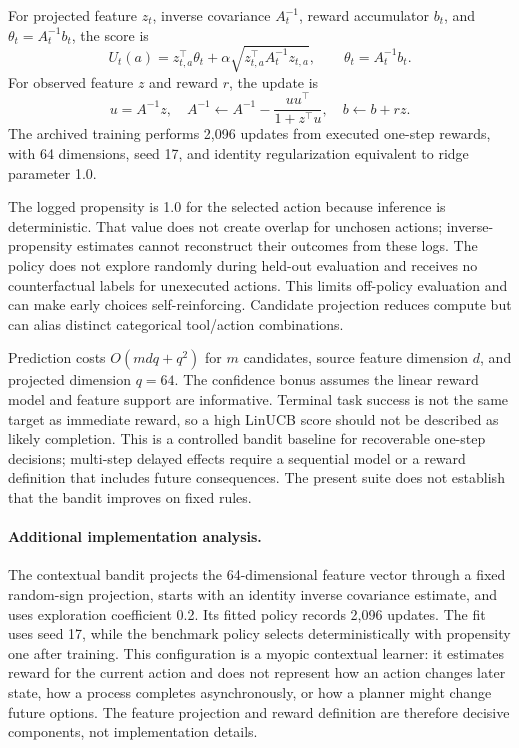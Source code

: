 For projected feature $z_t$, inverse covariance $A_t^{-1}$, reward accumulator $b_t$, and $\theta_t=A_t^{-1}b_t$, the score is
\begin{equation}
U_t(a)=z_{t,a}^{\top}\theta_t+\alpha\sqrt{z_{t,a}^{\top}A_t^{-1}z_{t,a}},\qquad
\theta_t=A_t^{-1}b_t.
\end{equation}
For observed feature $z$ and reward $r$, the update is
\begin{equation}
u=A^{-1}z,\quad A^{-1}\leftarrow A^{-1}-\frac{uu^\top}{1+z^\top u},\quad
b\leftarrow b+rz.
\end{equation}
The archived training performs 2,096 updates from executed one-step rewards, with 64 dimensions, seed 17, and identity regularization equivalent to ridge parameter 1.0.

The logged propensity is 1.0 for the selected action because inference is deterministic. That value does not create overlap for unchosen actions; inverse-propensity estimates cannot reconstruct their outcomes from these logs. The policy does not explore randomly during held-out evaluation and receives no counterfactual labels for unexecuted actions. This limits off-policy evaluation and can make early choices self-reinforcing. Candidate projection reduces compute but can alias distinct categorical tool/action combinations.

Prediction costs $O(mdq+q^2)$ for $m$ candidates, source feature dimension $d$, and projected dimension $q=64$. The confidence bonus assumes the linear reward model and feature support are informative. Terminal task success is not the same target as immediate reward, so a high LinUCB score should not be described as likely completion. This is a controlled bandit baseline for recoverable one-step decisions; multi-step delayed effects require a sequential model or a reward definition that includes future consequences. The present suite does not establish that the bandit improves on fixed rules.



\paragraph{Additional implementation analysis.} The contextual bandit projects the 64-dimensional feature vector through a fixed random-sign projection, starts with an identity inverse covariance estimate, and uses exploration coefficient 0.2. Its fitted policy records 2,096 updates. The fit uses seed 17, while the benchmark policy selects deterministically with propensity one after training. This configuration is a myopic contextual learner: it estimates reward for the current action and does not represent how an action changes later state, how a process completes asynchronously, or how a planner might change future options. The feature projection and reward definition are therefore decisive components, not implementation details.

